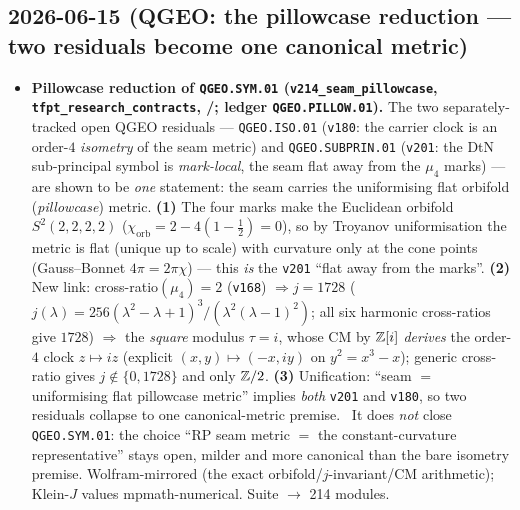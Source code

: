 \subsection*{2026-06-15 (QGEO: the pillowcase reduction --- two residuals become one canonical metric)}
\begin{itemize}
\item \textbf{Pillowcase reduction of \texttt{QGEO.SYM.01} (\texttt{v214\_seam\_pillowcase},
  \texttt{tfpt\_research\_contracts}, \mE/\mO; ledger \texttt{QGEO.PILLOW.01}).} The two separately-tracked
  open QGEO residuals --- \texttt{QGEO.ISO.01} (\texttt{v180}: the carrier clock is an order-$4$
  \emph{isometry} of the seam metric) and \texttt{QGEO.SUBPRIN.01} (\texttt{v201}: the DtN sub-principal
  symbol is \emph{mark-local}, the seam flat away from the $\mu_4$ marks) --- are shown to be \emph{one}
  statement: the seam carries the uniformising flat orbifold (\emph{pillowcase}) metric. \textbf{(1)} The
  four marks make the Euclidean orbifold $S^2(2,2,2,2)$ ($\chi_{\mathrm{orb}}=2-4(1-\tfrac12)=0$), so by
  Troyanov uniformisation the metric is flat (unique up to scale) with curvature only at the cone points
  (Gauss--Bonnet $4\pi=2\pi\chi$) --- this \emph{is} the \texttt{v201} ``flat away from the marks''.
  \textbf{(2)} New link: cross-ratio$(\mu_4)=2$ (\texttt{v168}) $\Rightarrow j=1728$
  ($j(\lambda)=256(\lambda^2-\lambda+1)^3/(\lambda^2(\lambda-1)^2)$; all six harmonic cross-ratios give
  $1728$) $\Rightarrow$ the \emph{square} modulus $\tau=i$, whose CM by $\mathbb{Z}[i]$ \emph{derives} the order-$4$
  clock $z\mapsto iz$ (explicit $(x,y)\mapsto(-x,iy)$ on $y^2=x^3-x$); generic cross-ratio gives
  $j\notin\{0,1728\}$ and only $\mathbb{Z}/2$. \textbf{(3)} Unification: ``seam $=$ uniformising flat pillowcase
  metric'' implies \emph{both} \texttt{v201} and \texttt{v180}, so two residuals collapse to one
  canonical-metric premise. \mO\ It does \emph{not} close \texttt{QGEO.SYM.01}: the choice ``RP seam metric
  $=$ the constant-curvature representative'' stays open, milder and more canonical than the bare isometry
  premise. Wolfram-mirrored (the exact orbifold/$j$-invariant/CM arithmetic); Klein-$J$ values
  mpmath-numerical. Suite $\to$ 214 modules.
\end{itemize}

